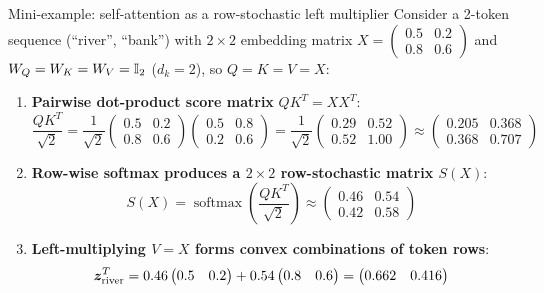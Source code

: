 \documentclass[aspectratio=169]{beamer}\usepackage[]{graphicx}\usepackage[]{xcolor}
\begin{document}
\begin{frame}{Mini-example: self-attention as a row-stochastic left multiplier}
Consider a 2-token sequence (``river'', ``bank'') with $2 \times 2$ embedding matrix $X = \begin{pmatrix} 0.5 & 0.2 \\ 0.8 & 0.6 \end{pmatrix}$ and $W_Q = W_K = W_V = \mathbb{I}_2$ ($d_k = 2$), so $Q = K = V = X$:
\vfill
\begin{enumerate}
\item \textbf{Pairwise dot-product score matrix} $Q K^T = X X^T$:
\[
\frac{Q K^T}{\sqrt{2}} = \frac{1}{\sqrt{2}} \begin{pmatrix} 0.5 & 0.2 \\ 0.8 & 0.6 \end{pmatrix} \begin{pmatrix} 0.5 & 0.8 \\ 0.2 & 0.6 \end{pmatrix}
= \frac{1}{\sqrt{2}} \begin{pmatrix} 0.29 & 0.52 \\ 0.52 & 1.00 \end{pmatrix}
\approx \begin{pmatrix} 0.205 & 0.368 \\ 0.368 & 0.707 \end{pmatrix}
\]
\item \textbf{Row-wise softmax produces a $2 \times 2$ row-stochastic matrix $S(X)$}:
\[
S(X) = \operatorname{softmax}\!\left(\frac{Q K^T}{\sqrt{2}}\right) \approx \begin{pmatrix} 0.46 & 0.54 \\ 0.42 & 0.58 \end{pmatrix}
\]
\item \textbf{Left-multiplying $V = X$ forms convex combinations of token rows}:
\[
\bm{z}_{\text{river}}^T = 0.46 \begin{pmatrix} 0.5 & 0.2 \end{pmatrix} + 0.54 \begin{pmatrix} 0.8 & 0.6 \end{pmatrix} = \begin{pmatrix} 0.662 & 0.416 \end{pmatrix}
\]
\end{enumerate}
\end{frame}
\end{document}

